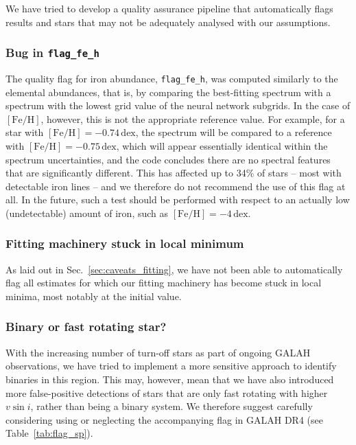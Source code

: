 \documentclass[
  journal=pasa,
  manuscript=research-paper, %
  year=2024,
  volume=37
]{cup-journal}
\newcommand{\feh}{$\mathrm{[Fe/H]}$\xspace}
\newcommand{\vsini}{$v \sin i$\xspace}
\begin{document}
We have tried to develop a quality assurance pipeline that automatically flags results and stars that may not be adequately analysed with our assumptions.

\subsubsection{Bug in \texttt{flag\_fe\_h}} \label{sec:bug_in_fe_h}

The quality flag for iron abundance, \texttt{flag\_fe\_h}, was computed similarly to the elemental abundances, that is, by comparing the best-fitting spectrum with a spectrum with the lowest grid value of the neural network subgrids. In the case of \feh, however, this is not the appropriate reference value. For example, for a star with $\mathrm{[Fe/H]} = -0.74\,\mathrm{dex}$, the spectrum will be compared to a reference with $\mathrm{[Fe/H]} = -0.75\,\mathrm{dex}$, which will appear essentially identical within the spectrum uncertainties, and the code concludes there are no spectral features that are significantly different. This has affected up to 34\% of stars -- most with detectable iron lines -- and we therefore do not recommend the use of this flag at all. In the future, such a test should be performed with respect to an actually low (undetectable) amount of iron, such as $\mathrm{[Fe/H]} = -4\,\mathrm{dex}$.

\subsubsection{Fitting machinery stuck in local minimum}

As laid out in Sec.~\ref{sec:caveats_fitting}, we have not been able to automatically flag all estimates for which our fitting machinery has become stuck in local minima, most notably at the initial value.

\subsubsection{Binary or fast rotating star?}

With the increasing number of turn-off stars as part of ongoing GALAH observations, we have tried to implement a more sensitive approach to identify binaries in this region. This may, however, mean that we have also introduced more false-positive detections of stars that are only fast rotating with higher \vsini, rather than being a binary system. We therefore suggest carefully considering using or neglecting the accompanying flag in GALAH DR4 (see Table~\ref{tab:flag_sp}).
\end{document}
